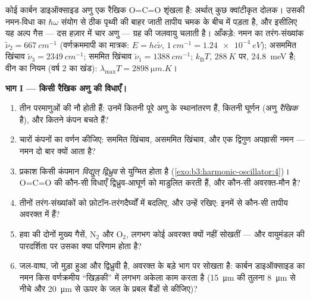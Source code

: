 \begin{problem}\label{pb:b3:harmonic-oscillator:1}
कोई कार्बन डाइऑक्साइड अणु एक रैखिक O=C=O शृंखला है: अर्थात् कुछ
क्वांटीकृत दोलक। उसकी नमन-विधा का $\hbar\omega$ संयोग से ठीक पृथ्वी की
बाहर जाती तापीय चमक के बीच में पड़ता है, और इसीलिए यह अल्प गैस ---
दस हज़ार में चार अणु --- ग्रह की जलवायु चलाती है। आँकड़े: नमन का
तरंग-संख्यांक $\tilde\nu_2 = \qty{667}{cm^{-1}}$
(वर्णक्रममापी का मात्रक: $E = hc\tilde\nu$, $\qty{1}{cm^{-1}} =
\qty{1.24e-4}{eV}$); असममित खिंचाव $\tilde\nu_3 =
\qty{2349}{cm^{-1}}$; सममित खिंचाव $\tilde\nu_1 =
\qty{1388}{cm^{-1}}$; $k_{\text{B}}T$, $\qty{288}{K}$ पर,
\qty{24.8}{meV} है; वीन का नियम (वर्ष 2 का खंड): $\lambda_{\max}T =
\qty{2898}{\micro m.K}$।

\medskip\noindent\textbf{भाग I --- किसी रैखिक अणु की विधाएँ।}
\begin{enumerate}
  \item तीन परमाणुओं की नौ  होती हैं: उनमें कितनी पूरे
        अणु के स्थानांतरण हैं, कितनी घूर्णन (अणु \emph{रैखिक} है), और
        कितने कंपन बचते हैं?
  \item चारों कंपनों का वर्णन कीजिए: सममित खिंचाव, असममित
        खिंचाव, और एक द्विगुण अपह्रासी नमन --- नमन दो बार क्यों आता है?
  \item प्रकाश किसी कंपमान \emph{विद्युत् द्विध्रुव} से युग्मित होता
        है (\cref{exo:b3:harmonic-oscillator:4})। O=C=O की कौन-सी
        विधाएँ द्विध्रुव-आघूर्ण को माडुलित करती हैं, और कौन-सी
        अवरक्त-मौन है?
  \item तीनों तरंग-संख्यांकों को फ़ोटॉन-तरंगदैर्घ्यों में बदलिए, और
        उन्हें रखिए: इनमें से कौन-सी तापीय अवरक्त में हैं?
  \item हवा की दोनों मुख्य गैसें, N$_2$ और O$_2$, लगभग कोई अवरक्त
        क्यों नहीं सोखतीं --- और वायुमंडल की पारदर्शिता पर उसका क्या
        परिणाम होता है?
  \item जल-वाष्प, जो मुड़ा हुआ और द्विध्रुवी है, अवरक्त के बड़े भाग
        पर सोखता है: कार्बन डाइऑक्साइड का नमन किस वर्णक्रमीय
        ``खिड़की'' में लगभग अकेला काम करता है (\qty{15}{\micro m} की
        तुलना \qty{8}{\micro m} से नीचे और \qty{20}{\micro m} से ऊपर
        के जल के प्रबल बैंडों से कीजिए)?
\end{enumerate}


\end{problem}
